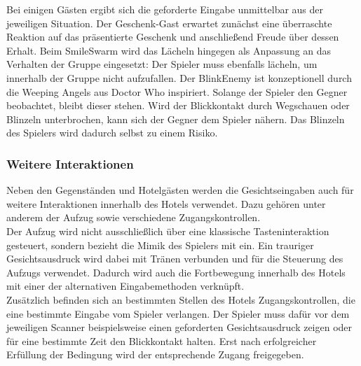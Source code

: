 \documentclass[intern]{cgMA}
\begin{document}
Bei einigen Gästen ergibt sich die geforderte Eingabe unmittelbar aus der jeweiligen Situation. Der Geschenk-Gast erwartet zunächst eine überraschte Reaktion auf das präsentierte Geschenk und anschließend Freude über dessen Erhalt. Beim SmileSwarm wird das Lächeln hingegen als Anpassung an das Verhalten der Gruppe eingesetzt: Der Spieler muss ebenfalls lächeln, um innerhalb der Gruppe nicht aufzufallen. Der BlinkEnemy ist konzeptionell durch die Weeping Angels aus Doctor Who\cite{doctorwhoWeepingAngels} inspiriert. Solange der Spieler den Gegner beobachtet, bleibt dieser stehen. Wird der Blickkontakt durch Wegschauen oder Blinzeln unterbrochen, kann sich der Gegner dem Spieler nähern. Das Blinzeln des Spielers wird dadurch selbst zu einem Risiko.
\subsubsection{Weitere Interaktionen}
Neben den Gegenständen und Hotelgästen werden die Gesichtseingaben auch für weitere Interaktionen innerhalb des Hotels verwendet. Dazu gehören unter anderem der Aufzug sowie verschiedene Zugangskontrollen.\\
Der Aufzug wird nicht ausschließlich über eine klassische Tasteninteraktion gesteuert, sondern bezieht die Mimik des Spielers mit ein. Ein trauriger Gesichtsausdruck wird dabei mit Tränen verbunden und für die Steuerung des Aufzugs verwendet. Dadurch wird auch die Fortbewegung innerhalb des Hotels mit einer der alternativen Eingabemethoden verknüpft.\\
Zusätzlich befinden sich an bestimmten Stellen des Hotels Zugangskontrollen, die eine bestimmte Eingabe vom Spieler verlangen. Der Spieler muss dafür vor dem jeweiligen Scanner beispielsweise einen geforderten Gesichtsausdruck zeigen oder für eine bestimmte Zeit den Blickkontakt halten. Erst nach erfolgreicher Erfüllung der Bedingung wird der entsprechende Zugang freigegeben.
\end{document}
